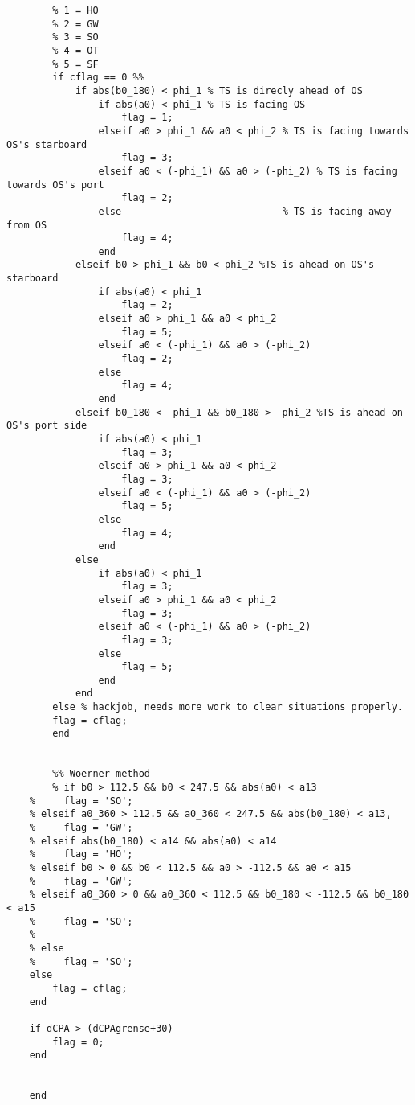 \begin{lstlisting}
        % 1 = HO
        % 2 = GW
        % 3 = SO
        % 4 = OT
        % 5 = SF
        if cflag == 0 %%
            if abs(b0_180) < phi_1 % TS is direcly ahead of OS
                if abs(a0) < phi_1 % TS is facing OS
                    flag = 1;
                elseif a0 > phi_1 && a0 < phi_2 % TS is facing towards OS's starboard
                    flag = 3;
                elseif a0 < (-phi_1) && a0 > (-phi_2) % TS is facing towards OS's port
                    flag = 2;
                else                            % TS is facing away from OS
                    flag = 4; 
                end
            elseif b0 > phi_1 && b0 < phi_2 %TS is ahead on OS's starboard
                if abs(a0) < phi_1
                    flag = 2;   
                elseif a0 > phi_1 && a0 < phi_2
                    flag = 5;
                elseif a0 < (-phi_1) && a0 > (-phi_2)
                    flag = 2;
                else
                    flag = 4;
                end
            elseif b0_180 < -phi_1 && b0_180 > -phi_2 %TS is ahead on OS's port side
                if abs(a0) < phi_1
                    flag = 3;   
                elseif a0 > phi_1 && a0 < phi_2
                    flag = 3;
                elseif a0 < (-phi_1) && a0 > (-phi_2)
                    flag = 5;
                else
                    flag = 4;
                end
            else
                if abs(a0) < phi_1
                    flag = 3;   
                elseif a0 > phi_1 && a0 < phi_2
                    flag = 3;
                elseif a0 < (-phi_1) && a0 > (-phi_2)
                    flag = 3;
                else
                    flag = 5;
                end    
            end
        else % hackjob, needs more work to clear situations properly.
        flag = cflag;
        end
            
        
        %% Woerner method
        % if b0 > 112.5 && b0 < 247.5 && abs(a0) < a13
    %     flag = 'SO';
    % elseif a0_360 > 112.5 && a0_360 < 247.5 && abs(b0_180) < a13,
    %     flag = 'GW';
    % elseif abs(b0_180) < a14 && abs(a0) < a14
    %     flag = 'HO';
    % elseif b0 > 0 && b0 < 112.5 && a0 > -112.5 && a0 < a15
    %     flag = 'GW';
    % elseif a0_360 > 0 && a0_360 < 112.5 && b0_180 < -112.5 && b0_180 < a15
    %     flag = 'SO';
    %     
    % else
    %     flag = 'SO';
    else
        flag = cflag;
    end
    
    if dCPA > (dCPAgrense+30)
        flag = 0;
    end
    
    
    end

\end{lstlisting}


